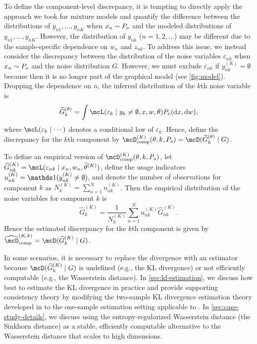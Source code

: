 To define the component-level discrepancy, it is tempting to directly apply the approach we took for mixture models
and quantify the difference between the distributions of $y_{n1},\dots,y_{nK}$ when $x_n \sim P_o$ and the modeled distributions of $y_{n1},\dots,y_{nK}$.
However, the distribution of $y_{nk}$ ($n=1,2,\dots$) may be different due to the sample-specific dependence on $w_n$ and $z_{nk}$.
To address this issue, we instead consider the discrepancy between the distribution of the noise variables $\varepsilon_{nk}$ when $x_n \sim P_o$ and the noise distribution $G$.
However, we must exclude $\varepsilon_{nk}$ if $y^{(K)}_{nk} = \emptyset$ because then it is no longer part of the graphical model (see \cref{fig:model}).
Dropping the dependence on $n$, the inferred distribution of the $k$th noise variable is
\[
\widetilde{G}_k^{(\theta)} = \int \mcL(\veps_{k} \mid y_k \ne \emptyset, x, w, \theta) P_o(\d x, \d w),
\]
where $\mcL(\veps_{k} \mid \cdots)$ denotes a conditional law of $\varepsilon_k$. 
Hence, define the discrepancy for the $k$th component by $\compDisc^{(K)}(\theta, k, P_o) = \discr{\widetilde G_k^{(\theta)}}{G}$.

To define an empirical version of $\compDisc^{(K)}(\theta, k, P_o)$, let
$\widehat G_{nk}^{(K)} = \mcL(\varepsilon_{nk} \mid x_n, w_n, \widehat\theta^{(K)})$, 
define the usage indicators $u_{nk}^{(K)} = \ind(y_{nk}^{(K)} \ne \emptyset)$, and denote the number of observations for component $k$ as $N_k^{(K)} = \sum_{n=1}^N u_{nk}^{(K)}$.
Then the empirical distribution of the noise variables for component $k$ is
\[
	\widehat G_k^{(K)} = \frac{1}{N_k^{(K)}} \sum_{n=1}^N u_{nk}^{(K)} \widehat G_{nk}^{(K)}.
\]
Hence the estimated discrepancy for the $k$th component is given by $\compDiscEst^{(K,k)} = \discr{\widehat G_k^{(K)}}{G}$. 

In some scenarios, it is necessary to replace the divergence with an estimator because 
$\discr{\widehat G_k^{(K)}}{G}$ is undefined (e.g., the KL divergence) or not efficiently computable (e.g., the Wasserstein distance).
In \cref{sec:kl-estimation}, we discuss how best to estimate the KL divergence in practice and provide supporting
consistency theory by modifying the two-sample KL divergence estimation theory developed in \citet{Wang:2009} to the one-sample estimation setting applicable to \methodname. 
In \cref{sec:case-study-details}, we discuss using the entropy-regularized Wasserstein distance (the Sinkhorn distance) 
as a stable, efficiently computable alternative to the Wasserstein distance that scales to high dimensions. 


